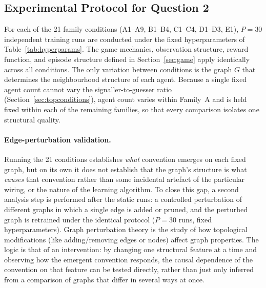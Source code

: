 \documentclass[a4paper,twoside,12pt]{report}
\begin{document}
    
    
    \subsection{Experimental Protocol for Question 2}
    
    For each of the 21 family conditions (A1--A9, B1--B4, C1--C4, D1--D3, E1),
    $P = 30$ independent training runs are conducted under the fixed
    hyperparameters of Table~\ref{tab:hyperparams}. The game mechanics,
    observation structure, reward function, and episode structure defined in
    Section~\ref{sec:game} apply identically across all conditions. The only
    variation between conditions is the graph $G$ that determines the
    neighbourhood structure of each agent. Because a single fixed agent count
    cannot vary the signaller-to-guesser ratio (Section~\ref{sec:topconditions}),
    agent count varies within Family~A and is held fixed within each of the
    remaining families, so that every comparison isolates one structural quality.
    
    \paragraph{Edge-perturbation validation.}
    Running the 21 conditions establishes \emph{what} convention emerges on each
    fixed graph, but on its own it does not establish that the graph's structure
    is what \emph{causes} that convention rather than some incidental artefact of
    the particular wiring, or the nature of the learning algorithm.
    \newline
    To close this gap, a second analysis step is performed
    after the static runs: a controlled perturbation of different graphs in which a
    single edge is added or pruned, and the perturbed graph is retrained under the
    identical protocol ($P = 30$ runs, fixed hyperparameters). Graph perturbation theory is the study of how topological modifications (like adding/removing edges or nodes) affect graph properties.
    \newline
    The logic is that
    of an intervention: by changing one structural feature at a time and observing
    how the emergent convention responds, the causal dependence of the convention
    on that feature can be tested directly, rather than just only inferred from a comparison
    of graphs that differ in several ways at once.
    
\end{document}
